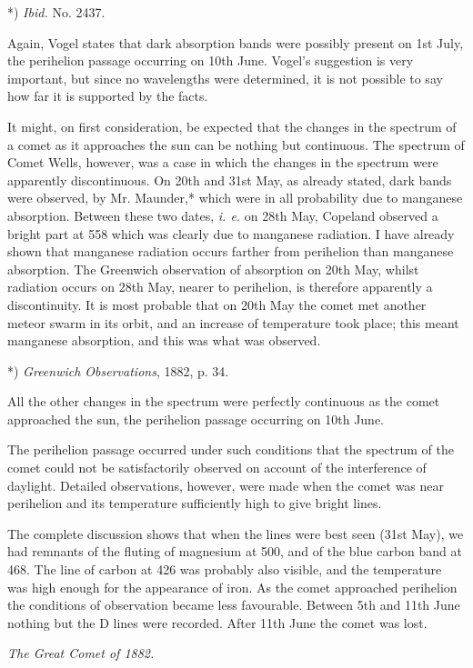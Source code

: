 \documentclass[a4paper, 12pt, oneside, polutonikogreek, english]{article}
\begin{document}
*) \emph{Ibid.} No. 2437.

Again, Vogel states that dark absorption bands were possibly present on 1st July, the perihelion passage occurring on 10th June. Vogel's suggestion is very important, but since no wavelengths were determined, it is not possible to say how far it is supported by the facts.

It might, on first consideration, be expected that the changes in the spectrum of a comet as it approaches the sun can be nothing but continuous. The spectrum of Comet Wells, however, was a case in which the changes in the spectrum were apparently discontinuous. On 20th and 31st May, as already stated, dark bands were observed, by Mr. Maunder,* which were in all probability due to manganese absorption. Between these two dates, \emph{i. e.} on 28th May, Copeland observed a bright part at 558 which was clearly due to manganese radiation. I have already shown that manganese radiation occurs farther from perihelion than manganese absorption. The Greenwich observation of absorption on 20th May, whilst radiation occurs on 28th May, nearer to perihelion, is therefore apparently a discontinuity. It is most probable that on 20th May the comet met another meteor swarm in its orbit, and an increase of temperature took place; this meant manganese absorption, and this was what was observed.

*) \emph{Greenwich Observations}, 1882, p. 34.

All the other changes in the spectrum were perfectly continuous as the comet approached the sun, the perihelion passage occurring on 10th June.

The perihelion passage occurred under such conditions that the spectrum of the comet could not be satisfactorily observed on account of the interference of daylight. Detailed observations, however, were made when the comet was near perihelion and its temperature sufficiently high to give bright lines.

The complete discussion shows that when the lines were best seen (31st May), we had remnants of the fluting of magnesium at 500, and of the blue carbon band at 468. The line of carbon at 426 was probably also visible, and the temperature was high enough for the appearance of iron. As the comet approached perihelion the conditions of observation became less favourable. Between 5th and 11th June nothing but the D lines were recorded. After 11th June the comet was lost.

\emph{The Great Comet of 1882.}
\end{document}
